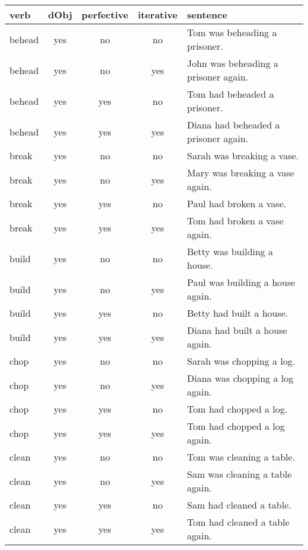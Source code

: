 \begin{longtable}{l|ccc|p{5cm}}
\textbf{verb}     & \textbf{dObj} & \textbf{perfective} & \textbf{iterative}    & \textbf{sentence} \\
\hline
\endhead
behead    & yes  & no   & no   & Tom was beheading a prisoner.                \\
behead    & yes  & no   & yes  & John was beheading a prisoner again.         \\
behead    & yes  & yes  & no   & Tom had beheaded a prisoner.                 \\
behead    & yes  & yes  & yes  & Diana had beheaded a prisoner again.         \\
break     & yes  & no   & no   & Sarah was breaking a vase.                   \\
break     & yes  & no   & yes  & Mary was breaking a vase again.              \\
break     & yes  & yes  & no   & Paul had broken a vase.                      \\
break     & yes  & yes  & yes  & Tom had broken a vase again.                 \\
build     & yes  & no   & no   & Betty was building a house.                  \\
build     & yes  & no   & yes  & Paul was building a house again.             \\
build     & yes  & yes  & no   & Betty had built a house.                     \\
build     & yes  & yes  & yes  & Diana had built a house again.               \\
chop      & yes  & no   & no   & Sarah was chopping a log.                    \\
chop      & yes  & no   & yes  & Diana was chopping a log again.              \\
chop      & yes  & yes  & no   & Tom had chopped a log.                       \\
chop      & yes  & yes  & yes  & Tom had chopped a log again.                 \\
clean     & yes  & no   & no   & Tom was cleaning a table.                    \\
clean     & yes  & no   & yes  & Sam was cleaning a table again.              \\
clean     & yes  & yes  & no   & Sam had cleaned a table.                     \\
clean     & yes  & yes  & yes  & Tom had cleaned a table again.               \\

\end{longtable}
